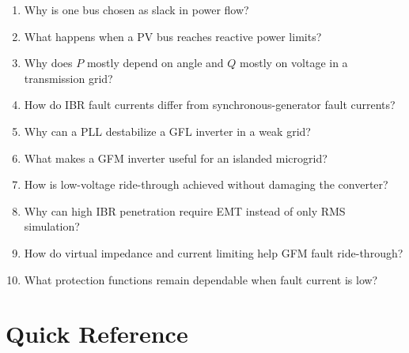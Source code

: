 \documentclass[11pt]{article}
\begin{document}
\begin{enumerate}
  \item Why is one bus chosen as slack in power flow?
  \item What happens when a PV bus reaches reactive power limits?
  \item Why does $P$ mostly depend on angle and $Q$ mostly on voltage in a
  transmission grid?
  \item How do IBR fault currents differ from synchronous-generator fault currents?
  \item Why can a PLL destabilize a GFL inverter in a weak grid?
  \item What makes a GFM inverter useful for an islanded microgrid?
  \item How is low-voltage ride-through achieved without damaging the converter?
  \item Why can high IBR penetration require EMT instead of only RMS simulation?
  \item How do virtual impedance and current limiting help GFM fault ride-through?
  \item What protection functions remain dependable when fault current is low?
\end{enumerate}

\section{Quick Reference}
\end{document}
